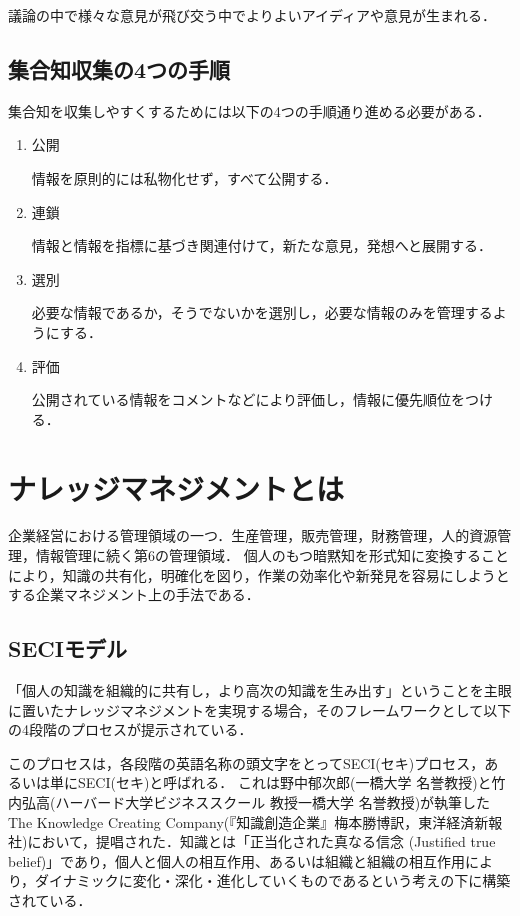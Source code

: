 議論の中で様々な意見が飛び交う中でよりよいアイディアや意見が生まれる．

\section{集合知収集の4つの手順}
集合知を収集しやすくするためには以下の4つの手順通り進める必要がある．
\begin{enumerate}
  \item 公開

情報を原則的には私物化せず，すべて公開する．

  \item 連鎖

情報と情報を指標に基づき関連付けて，新たな意見，発想へと展開する．

  \item 選別

必要な情報であるか，そうでないかを選別し，必要な情報のみを管理するようにする．
  \item 評価

公開されている情報をコメントなどにより評価し，情報に優先順位をつける．




\end{enumerate}


\chapter{ナレッジマネジメントとは}
企業経営における管理領域の一つ．生産管理，販売管理，財務管理，人的資源管理，情報管理に続く第6の管理領域．
個人のもつ暗黙知を形式知に変換することにより，知識の共有化，明確化を図り，作業の効率化や新発見を容易にしようとする企業マネジメント上の手法である\cite{management}．

\section{SECIモデル}
「個人の知識を組織的に共有し，より高次の知識を生み出す」ということを主眼に置いたナレッジマネジメントを実現する場合，そのフレームワークとして以下の4段階のプロセスが提示されている．

このプロセスは，各段階の英語名称の頭文字をとってSECI(セキ)プロセス，あるいは単にSECI(セキ)と呼ばれる．
これは野中郁次郎(一橋大学 名誉教授)と竹内弘高(ハーバード大学ビジネススクール 教授一橋大学 名誉教授)が執筆したThe Knowledge Creating Company(『知識創造企業』梅本勝博訳，東洋経済新報社)において，提唱された．知識とは「正当化された真なる信念 (Justified true belief)」であり，個人と個人の相互作用、あるいは組織と組織の相互作用により，ダイナミックに変化・深化・進化していくものであるという考えの下に構築されている．

